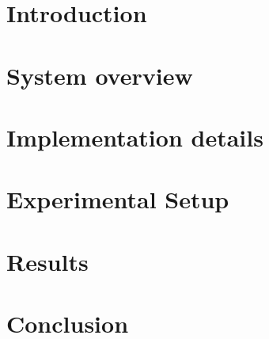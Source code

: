 \documentclass[11pt, a4paper, twocolumn]{article}
\begin{document}
    
    
    
	
    \section{Introduction}
        

    \section{System overview}
        
    \section{Implementation details}
        
        
    \section{Experimental Setup}
        
    \section{Results}
        
        
    \section{Conclusion}
        

%
%
\end{document}

